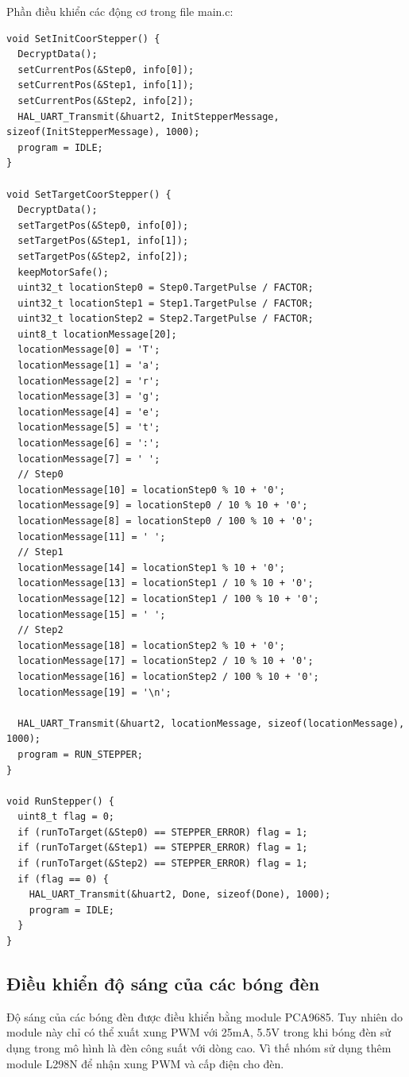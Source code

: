 Phần điều khiển các động cơ trong file main.c:
\begin{lstlisting}
void SetInitCoorStepper() {
  DecryptData();
  setCurrentPos(&Step0, info[0]);
  setCurrentPos(&Step1, info[1]);
  setCurrentPos(&Step2, info[2]);
  HAL_UART_Transmit(&huart2, InitStepperMessage, sizeof(InitStepperMessage), 1000);
  program = IDLE;
}

void SetTargetCoorStepper() {
  DecryptData();
  setTargetPos(&Step0, info[0]);
  setTargetPos(&Step1, info[1]);
  setTargetPos(&Step2, info[2]);
  keepMotorSafe();
  uint32_t locationStep0 = Step0.TargetPulse / FACTOR;
  uint32_t locationStep1 = Step1.TargetPulse / FACTOR;
  uint32_t locationStep2 = Step2.TargetPulse / FACTOR;
  uint8_t locationMessage[20];
  locationMessage[0] = 'T';
  locationMessage[1] = 'a';
  locationMessage[2] = 'r';
  locationMessage[3] = 'g';
  locationMessage[4] = 'e';
  locationMessage[5] = 't';
  locationMessage[6] = ':';
  locationMessage[7] = ' ';
  // Step0
  locationMessage[10] = locationStep0 % 10 + '0';
  locationMessage[9] = locationStep0 / 10 % 10 + '0';
  locationMessage[8] = locationStep0 / 100 % 10 + '0';
  locationMessage[11] = ' ';
  // Step1
  locationMessage[14] = locationStep1 % 10 + '0';
  locationMessage[13] = locationStep1 / 10 % 10 + '0';
  locationMessage[12] = locationStep1 / 100 % 10 + '0';
  locationMessage[15] = ' ';
  // Step2
  locationMessage[18] = locationStep2 % 10 + '0';
  locationMessage[17] = locationStep2 / 10 % 10 + '0';
  locationMessage[16] = locationStep2 / 100 % 10 + '0';
  locationMessage[19] = '\n';

  HAL_UART_Transmit(&huart2, locationMessage, sizeof(locationMessage), 1000);
  program = RUN_STEPPER;
}

void RunStepper() {
  uint8_t flag = 0;
  if (runToTarget(&Step0) == STEPPER_ERROR) flag = 1;
  if (runToTarget(&Step1) == STEPPER_ERROR) flag = 1;
  if (runToTarget(&Step2) == STEPPER_ERROR) flag = 1;
  if (flag == 0) {
    HAL_UART_Transmit(&huart2, Done, sizeof(Done), 1000);
    program = IDLE;
  }
}
\end{lstlisting}

\subsection{Điều khiển độ sáng của các bóng đèn}
Độ sáng của các bóng đèn được điều khiển bằng module PCA9685. Tuy nhiên do module này chỉ có thể xuất xung PWM với 25mA, 5.5V trong khi bóng đèn sử dụng trong mô hình là đèn công suất với dòng cao. Vì thế nhóm sử dụng thêm module L298N để nhận xung PWM và cấp điện cho đèn.

